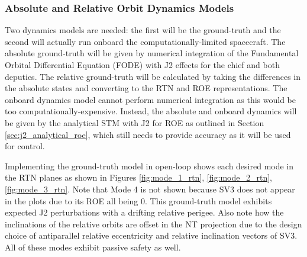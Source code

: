 \subsubsection{Absolute and Relative Orbit Dynamics Models}
Two dynamics models are needed: the first will be the ground-truth and the second will actually run onboard the computationally-limited spacecraft. The absolute ground-truth will be given by numerical integration of the Fundamental Orbital Differential Equation (FODE) with J2 effects for the chief and both deputies. The relative ground-truth will be calculated by taking the differences in the absolute states and converting to the RTN and ROE representations. The onboard dynamics model cannot perform numerical integration as this would be too computationally-expensive. Instead, the absolute and onboard dynamics will be given by the analytical STM with J2 for ROE as outlined in Section \ref{sec:j2_analytical_roe}, which still needs to provide accuracy as it will be used for control. 

Implementing the ground-truth model in open-loop shows each desired mode in the RTN planes as shown in Figures \ref{fig:mode_1_rtn}, \ref{fig:mode_2_rtn}, \ref{fig:mode_3_rtn}. Note that Mode 4 is not shown because SV3 does not appear in the plots due to its ROE all being 0. This ground-truth model exhibits expected J2 perturbations with a drifting relative perigee. Also note how the inclinations of the relative orbits are offset in the NT projection due to the design choice of antiparallel relative eccentricity and relative inclination vectors of SV3. All of these modes exhibit passive safety as well. 

